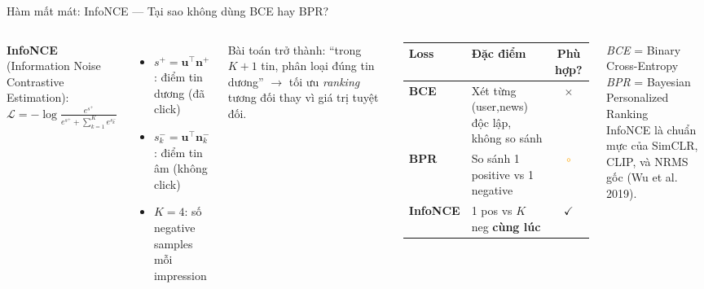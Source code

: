 \documentclass[aspectratio=169,11pt]{beamer}
\newcommand{\ok}{\textcolor{accentteal}{$\checkmark$}}
\newcommand{\bad}{\textcolor{warnred}{$\times$}}
\newcommand{\faMinusCircle}{$\circ$}
\begin{document}
\begin{frame}{Hàm mất mát: InfoNCE --- Tại sao không dùng BCE hay BPR?}
  \begin{columns}[T]
      \textbf{InfoNCE} (Information Noise Contrastive Estimation):
      $
        \mathcal{L} = -\log \frac{e^{s^+}}{e^{s^+} + \sum_{k=1}^{K} e^{s_k^-}}
      $
      \begin{itemize}
        \item $s^+ = \mathbf{u}^\top \mathbf{n}^+$: điểm tin dương (đã click)
        \item $s_k^- = \mathbf{u}^\top \mathbf{n}_k^-$: điểm tin âm (không click)
        \item $K=4$: số negative samples mỗi impression
      \end{itemize}

      \vspace{0.3em}
      \begin{keybox}[title={Tương đương cross-entropy $K$-class}]
        \footnotesize
        Bài toán trở thành: ``trong $K{+}1$ tin,
        phân loại đúng tin dương'' $\to$
        tối ưu \textit{ranking} tương đối thay vì
        giá trị tuyệt đối.
      \end{keybox}

      \begin{table}
        \footnotesize
        \begin{tabular}{>{\bfseries}lp{4.0cm}c}
          \toprule
          Loss & Đặc điểm & Phù hợp?\\
          \midrule
          BCE & Xét từng (user,news) độc lập, không so sánh & \bad\\[0.3em]
          BPR & So sánh 1 positive vs 1 negative & \textcolor{orange}{\faMinusCircle}\\[0.3em]
          \textbf{InfoNCE} & 1 pos vs $K$ neg \textbf{cùng lúc} & \ok\\
          \bottomrule
        \end{tabular}
      \end{table}
      \vspace{0.3em}
      {\footnotesize
      \textit{BCE} = Binary Cross-Entropy\\
      \textit{BPR} = Bayesian Personalized Ranking\\
      InfoNCE là chuẩn mực của SimCLR, CLIP,
      và NRMS gốc (Wu et al. 2019).}
  \end{columns}
\end{frame}
\end{document}

